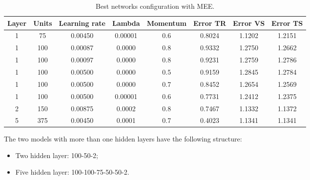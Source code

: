 \begin{table}[h!]
	\centering
	\begin{tabular}{|c|c|c|c|c|c|c|c|}
		\hline
		\textbf{Layer}& \textbf{Units}& \textbf{Learning rate} & \multicolumn{1}{l|}{\textbf{Lambda}} & \textbf{Momentum} & \textbf{Error TR}& \textbf{Error VS}& \textbf{Error TS}\\ \hline
			1 & 75 & 0.00450 & 0.00001 & 0.6  & 0.8024 & 1.1202 & 1.2151  \\
			1 & 100 & 0.00087 & 0.0000 & 0.8  & 0.9332 & 1.2750 &  1.2662\\
			1 & 100 & 0.00097 & 0.0000 & 0.8  & 0.9231 & 1.2759 &  1.2786\\
			1 & 100 & 0.00500 & 0.0000 & 0.5  & 0.9159 & 1.2845 & 1.2784 \\
			1 & 100 & 0.00500 & 0.0000 & 0.7  & 0.8452 & 1.2654 & 1.2569 \\
			1 & 100 & 0.00500 & 0.00001 & 0.6  & 0.7731& 1.2412 & 1.2375 \\
			2 & 150 & 0.00875 & 0.0002 & 0.8  & 0.7467 & 1.1332 &  1.1372 \\
			5 & 375 & 0.00450 & 0.0001 & 0.7  & 0.4023 & 1.1341 &  1.1341 \\
		  \hline
	\end{tabular}
	\label{net:best-result}
		\caption{Best networks configuration with MEE.}
\end{table}

The two models with more than one hidden layers have the following structure:
\begin{itemize}
	\item Two hidden layer: 100-50-2;
	\item Five hidden layer: 100-100-75-50-50-2.
\end{itemize}

